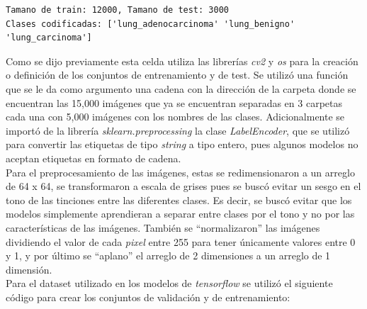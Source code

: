 
\begin{lstlisting}[caption=Salida del código]
Tamano de train: 12000, Tamano de test: 3000
Clases codificadas: ['lung_adenocarcinoma' 'lung_benigno' 'lung_carcinoma']
\end{lstlisting}

Como se dijo previamente esta celda utiliza las librerías \textit{cv2} y \textit{os} para la creación o definición de los conjuntos de entrenamiento y de test. Se utilizó una función que se le da como argumento una cadena con la dirección de la carpeta donde se encuentran las 15,000 imágenes que ya se encuentran separadas en 3 carpetas cada una con 5,000 imágenes con los nombres de las clases. Adicionalmente se importó de la librería \textit{sklearn.preprocessing} la clase \textit{LabelEncoder}, que se utilizó para convertir las etiquetas de tipo \textit{string} a tipo entero, pues algunos modelos no aceptan etiquetas en formato de cadena. \\
Para el preprocesamiento de las imágenes, estas se redimensionaron a un arreglo de 64 x 64, se transformaron a escala de grises pues se buscó evitar un sesgo en el tono de las tinciones entre las diferentes clases. Es decir, se buscó evitar que los modelos simplemente aprendieran a separar entre clases por el tono y no por las características de las imágenes. También se ``normalizaron'' las imágenes dividiendo el valor de cada \textit{pixel} entre 255 para tener únicamente valores entre 0 y 1, y por último se ``aplano'' el arreglo de 2 dimensiones a un arreglo de 1 dimensión.
\\

Para el dataset utilizado en los modelos de \textit{tensorflow} se utilizó el siguiente código para crear los conjuntos de validación y de entrenamiento: \\ 
\\
\\
\\
\\

